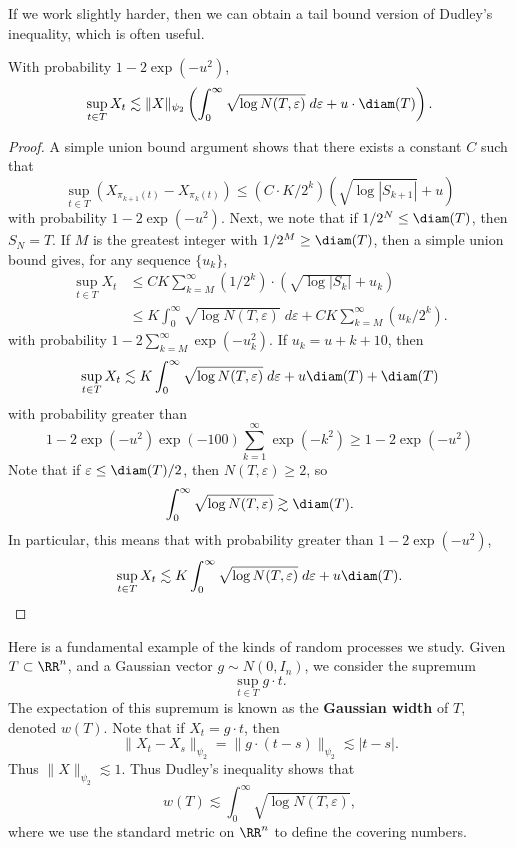 If we work slightly harder, then we can obtain a tail bound version of Dudley's inequality, which is often useful.

\begin{theorem}
	With probability $1 - 2 \exp(-u^2)$,
	\[ \sup_{t \in T} X_t \lesssim \| X \|_{\psi_2} \left( \int_0^\infty \sqrt{\log N(T,\varepsilon)}\; d\varepsilon + u \cdot \diam(T) \right). \]
\end{theorem}
\begin{proof}
	A simple union bound argument shows that there exists a constant $C$ such that
	\[ \sup_{t \in T} (X_{\pi_{k+1}(t)} - X_{\pi_k(t)}) \leq (C \cdot K/2^k) \left(\sqrt{\log |S_{k+1}|} + u \right) \]
	with probability $1 - 2\exp(-u^2)$. Next, we note that if $1/2^N \leq \diam(T)$, then $S_N = T$. If $M$ is the greatest integer with $1/2^M \geq \diam(T)$, then a simple union bound gives, for any sequence $\{ u_k \}$,
	\begin{align*}
		\sup_{t \in T} X_t &\leq C K \sum_{k = M}^{\infty} (1/2^k) \cdot \left( \sqrt{\log |S_k|} + u_k \right)\\
		&\leq K \int_0^\infty \sqrt{\log N(T,\varepsilon)}\; d\varepsilon + C K \sum_{k = M}^\infty (u_k/2^k).
	\end{align*}
	with probability $1 - 2 \sum_{k = M}^\infty \exp(-u_k^2)$. If $u_k = u + k + 10$, then
	\[ \sup_{t \in T} X_t \lesssim K \int_0^\infty \sqrt{\log N(T,\varepsilon)}\; d\varepsilon + u \diam(T) + \diam(T) \]
	with probability greater than
	\[ 1 - 2 \exp(-u^2) \exp(-100) \sum_{k = 1}^\infty \exp(-k^2) \geq 1 - 2\exp(-u^2) \]
	Note that if $\varepsilon \leq \diam(T)/2$, then $N(T,\varepsilon) \geq 2$, so
	\[ \int_0^\infty \sqrt{\log N(T,\varepsilon)} \gtrsim \diam(T). \]
	In particular, this means that with probability greater than $1 - 2 \exp(-u^2)$,
	\[ \sup_{t \in T} X_t \lesssim K \int_0^\infty \sqrt{\log N(T,\varepsilon)}\; d\varepsilon + u \diam(T). \qedhere \]
\end{proof}

Here is a fundamental example of the kinds of random processes we study. Given $T \subset \RR^n$, and a Gaussian vector $g \sim N(0,I_n)$, we consider the supremum
%
\[ \sup_{t \in T} g \cdot t. \]
%
The expectation of this supremum is known as the \textbf{Gaussian width} of $T$, denoted $w(T)$. Note that if $X_t = g \cdot t$, then
%
\[ \| X_t - X_s \|_{\psi_2} = \| g \cdot (t - s) \|_{\psi_2} \lesssim |t-s|. \]
%
Thus $\| X \|_{\psi_2} \lesssim 1$. Thus Dudley's inequality shows that
%
\[ w(T) \lesssim \int_0^\infty \sqrt{\log N(T,\varepsilon)}, \]
%
where we use the standard metric on $\RR^n$ to define the covering numbers.


